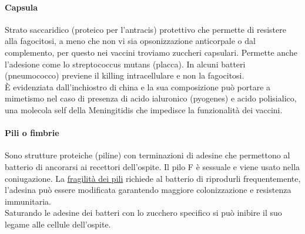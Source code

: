 \documentclass[10pt]{article}
\begin{document}
\paragraph*{Capsula} Strato saccaridico (proteico per l'antracis) protettivo che permette di resistere alla fagocitosi, a meno che non vi sia opsonizzazione anticorpale o dal complemento, per questo nei vaccini troviamo zuccheri capsulari. Permette anche l'adesione come lo streptococcus mutans (placca). In alcuni batteri (pneumococco) previene il killing intracellulare e non la fagocitosi.\\
È evidenziata dall'inchiostro di china e la sua composizione può portare a mimetismo nel caso di presenza di acido ialuronico (pyogenes) e acido polisialico, una molecola self della Meningitidis che impedisce la funzionalità dei vaccini.
\paragraph*{Pili o fimbrie}Sono strutture proteiche (piline) con terminazioni di adesine che permettono al batterio di ancorarsi ai recettori dell'ospite. Il pilo F è sessuale e viene usato nella coniugazione. La \underline{fragilità dei pili} richiede al batterio di riprodurli frequentemente, l'adesina può essere modificata garantendo maggiore colonizzazione e resistenza immunitaria. \\
Saturando le adesine dei batteri con lo zucchero specifico si può inibire il suo legame alle cellule dell'ospite.
\end{document}
